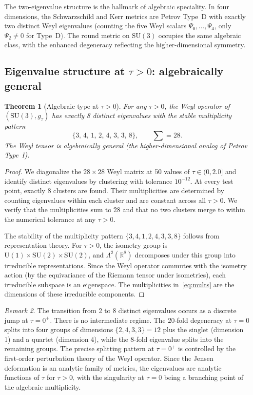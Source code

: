 \documentclass[12pt]{article}
\newtheorem{theorem}{Theorem}
\theoremstyle{definition}
\theoremstyle{remark}
\newtheorem{remark}[theorem]{Remark}
\begin{document}
The two-eigenvalue structure is the hallmark of algebraic speciality.  In four dimensions, the Schwarzschild and Kerr metrics are Petrov Type~D with exactly two distinct Weyl eigenvalues (counting the five Weyl scalars $\Psi_0,\ldots,\Psi_4$, only $\Psi_2\neq0$ for Type~D).  The round metric on $\mathrm{SU}(3)$ occupies the same algebraic class, with the enhanced degeneracy reflecting the higher-dimensional symmetry.

\subsection{Eigenvalue structure at \texorpdfstring{$\tau>0$}{tau > 0}: algebraically general}

\begin{theorem}[Algebraic type at $\tau>0$]
\label{thm:typeI}
For any $\tau>0$, the Weyl operator of $(\mathrm{SU}(3),g_\tau)$ has exactly 8 distinct eigenvalues with the stable multiplicity pattern
\begin{equation}
\label{eq:mults}
\{3,\,4,\,1,\,2,\,4,\,3,\,3,\,8\}, \qquad \sum = 28.
\end{equation}
The Weyl tensor is algebraically general (the higher-dimensional analog of Petrov Type~I).
\end{theorem}

\begin{proof}
We diagonalize the $28\times28$ Weyl matrix at 50 values of $\tau\in(0,2.0]$ and identify distinct eigenvalues by clustering with tolerance $10^{-12}$.  At every test point, exactly 8 clusters are found.  Their multiplicities are determined by counting eigenvalues within each cluster and are constant across all $\tau>0$.  We verify that the multiplicities sum to 28 and that no two clusters merge to within the numerical tolerance at any $\tau>0$.

The stability of the multiplicity pattern $\{3,4,1,2,4,3,3,8\}$ follows from representation theory.  For $\tau>0$, the isometry group is $\mathrm{U}(1)\times\mathrm{SU}(2)\times\mathrm{SU}(2)$, and $\Lambda^2(\mathbb{R}^8)$ decomposes under this group into irreducible representations.  Since the Weyl operator commutes with the isometry action (by the equivariance of the Riemann tensor under isometries), each irreducible subspace is an eigenspace.  The multiplicities in~\eqref{eq:mults} are the dimensions of these irreducible components.
\end{proof}

\begin{remark}
The transition from 2 to 8 distinct eigenvalues occurs as a discrete jump at $\tau=0^+$.  There is no intermediate regime.  The 20-fold degeneracy at $\tau=0$ splits into four groups of dimensions $\{2,4,3,3\}=12$ plus the singlet (dimension 1) and a quartet (dimension 4), while the 8-fold eigenvalue splits into the remaining groups.  The precise splitting pattern at $\tau=0^+$ is controlled by the first-order perturbation theory of the Weyl operator.  Since the Jensen deformation is an analytic family of metrics, the eigenvalues are analytic functions of $\tau$ for $\tau>0$, with the singularity at $\tau=0$ being a branching point of the algebraic multiplicity.
\end{remark}
\end{document}
